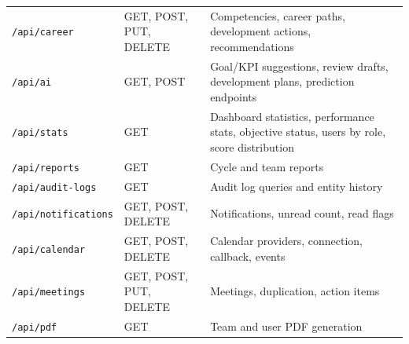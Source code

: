 \begin{longtable}{p{}p{}p{}}
\texttt{/api/career} & GET, POST, PUT, DELETE & Competencies, career paths, development actions, recommendations\\
\texttt{/api/ai} & GET, POST & Goal/KPI suggestions, review drafts, development plans, prediction endpoints\\
\texttt{/api/stats} & GET & Dashboard statistics, performance stats, objective status, users by role, score distribution\\
\texttt{/api/reports} & GET & Cycle and team reports\\
\texttt{/api/audit-logs} & GET & Audit log queries and entity history\\
\texttt{/api/notifications} & GET, POST, DELETE & Notifications, unread count, read flags\\
\texttt{/api/calendar} & GET, POST, DELETE & Calendar providers, connection, callback, events\\
\texttt{/api/meetings} & GET, POST, PUT, DELETE & Meetings, duplication, action items\\
\texttt{/api/pdf} & GET & Team and user PDF generation\\
\bottomrule
\end{longtable}
